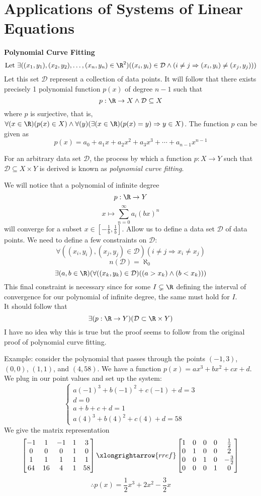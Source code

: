 \section{Applications of Systems of Linear Equations}
{\large\textbf{Polynomial Curve Fitting}}\\
$$\text{Let }\exists((x_1,y_1),(x_2,y_2),\ldots,(x_n,y_n)\in\R^2)((x_i,y_i)\in\mathcal{D}\land (i\neq j\Rightarrow(x_i,y_i)\neq(x_j,y_j)))$$
Let this set $\mathcal{D}$ represent a collection of data points. It will follow that there exists precisely 1 polynomial function $p(x)$ of degree $n-1$ such that
$$p:\R\rightarrow X\land\mathcal{D}\subseteq X$$
where $p$ is surjective, that is, $\forall(x\in\R)(p(x)\in X)\land\forall(y)(\exists(x\in\R)(p(x)=y)\Rightarrow y\in X)$. The function $p$ can be given as
$$p(x)=a_0+a_1x+a_2x^2+a_3x^3+\cdots+a_{n-1}x^{n-1}$$
\begin{definition}\label{def:4}
	For an arbitrary data set $\mathcal{D}$, the process by which a function $p:X\rightarrow Y$ such that $\mathcal{D}\subseteq X\times Y$ is derived is known as \emph{polynomial curve fitting}.
\end{definition}
\begin{remark}
	We will notice that a polynomial of infinite degree
	$$p:\R\rightarrow Y$$
	$$x\mapsto\sum_{n=0}^{\infty}a_i(bx)^n$$
	will converge for a subset $x\in\left[-\frac{1}{b},\frac{1}{b}\right]$. Allow us to define a data set $\mathcal{D}$ of data points. We need to define a few constraints on $\mathcal{D}$:
	$$\forall((x_i,y_i),(x_j,y_j)\in\mathcal{D})(i\neq j\Rightarrow x_i\neq x_j)$$
	$$n(\mathcal{D})=\aleph_0$$
	$$\exists(a,b\in\R)(\forall((x_k,y_k)\in\mathcal{D})((a>x_k)\land(b<x_k)))$$
	This final constraint is necessary since for some $I\subsetneq\R$ defining the interval of convergence for our polynomial of infinite degree, the same must hold for $I$.\\
	It should follow that
	$$\exists(p:\R\rightarrow Y)(\mathcal{D}\subset\R\times Y)$$
	I have no idea why this is true but the proof seems to follow from the original proof of polynomial curve fitting.
\end{remark}
Example: consider the polynomial that passes through the points $(-1,3)$, $(0,0)$, $(1,1)$, and $(4,58)$. We have a function $p(x)=ax^3+bx^2+cx+d$. We plug in our point values and set up the system:
$$\left\{\begin{array}{c}
	a(-1)^3+b(-1)^2+c(-1)+d=3\\
	d=0\\
	a+b+c+d=1\\
	a(4)^3+b(4)^2+c(4)+d=58
\end{array}\right.$$
We give the matrix representation
$$\begin{bmatrix}
	-1&1&-1&1&3\\0&0&0&1&0\\1&1&1&1&1\\64&16&4&1&58
\end{bmatrix}\xlongrightarrow{rref}\begin{bmatrix}
1&0&0&0&\frac{1}{2}\\0&1&0&0&2\\0&0&1&0&-\frac{3}{2}\\0&0&0&1&0
\end{bmatrix}$$
$$\therefore p(x)=\frac{1}{2}x^3+2x^2-\frac{3}{2}x$$